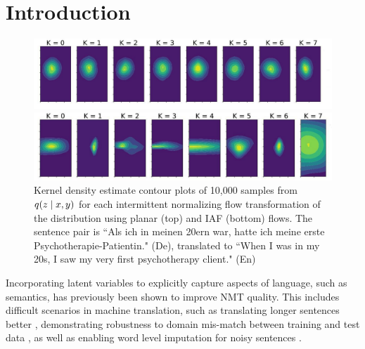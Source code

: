 
\chapter{Introduction}
\label{ch:Introduction}

\begin{figure}[ht]
	\vskip 0.2in
	\begin{center}
		\centerline{\includegraphics[width=\columnwidth]{planar_flows_plot_edited.pdf}}
		\centerline{\includegraphics[width=\columnwidth]{iaf_flows_plot_edited.pdf}}
		\caption{Kernel density estimate contour plots of 10,000 samples from $q(z \; | \;{x, y})$ for each intermittent normalizing flow transformation of the distribution using planar (top) and \ac{IAF} (bottom) flows. The sentence pair is ``Als ich in meinen 20ern war, hatte ich meine erste Psychotherapie-Patientin." (De), translated to ``When I was in my 20s, I saw my very first psychotherapy client." (En)}
		\label{flowsplot}
	\end{center}
	\vskip -0.2in
	\vspace{-4mm}
\end{figure}

Incorporating latent variables to explicitly capture aspects of language, such as semantics, has previously been shown to improve \ac{NMT} quality. This includes difficult scenarios in machine translation, such as translating longer sentences better \cite{Zhang2016VNMT, harshil2018GNMT, Su2018VRNMT}, demonstrating robustness to domain mis-match between training and test data \cite{eikema2018AEVNMT}, as well as enabling word level imputation for noisy sentences \cite{harshil2018GNMT}. 

